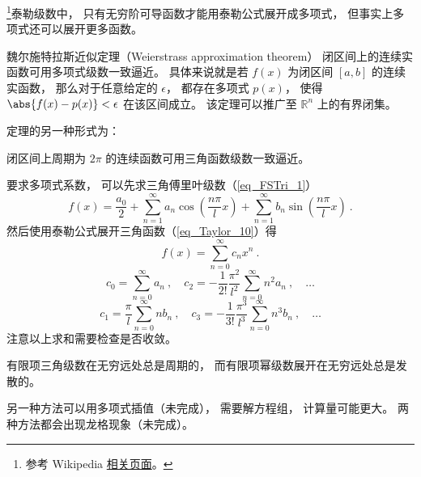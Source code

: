 \begin{issues}
\issueDraft
\end{issues}


\footnote{参考 Wikipedia \href{https://en.wikipedia.org/wiki/Stone\%E2\%80\%93Weierstrass_theorem}{相关页面}。}泰勒级数中， 只有无穷阶可导函数才能用泰勒公式展开成多项式， 但事实上多项式还可以展开更多函数。

\begin{theorem}{魏尔施特拉斯近似定理（Weierstrass approximation theorem）}
闭区间上的连续实函数可用多项式级数一致逼近。 具体来说就是若 $f(x)$ 为闭区间 $[a, b]$ 的连续实函数， 那么对于任意给定的 $\epsilon$， 都存在多项式 $p(x)$， 使得 $\abs{f(x) - p(x)} < \epsilon$ 在该区间成立。 该定理可以推广至 $\mathbb {R}^{n}$ 上的有界闭集。
\end{theorem}

定理的另一种形式为：
\begin{theorem}{}
闭区间上周期为 $2\pi$ 的连续函数可用三角函数级数一致逼近。
\end{theorem}

要求多项式系数， 可以先求三角傅里叶级数（\autoref{eq_FSTri_1}）
\begin{equation}
f(x) = \frac{a_0}{2} + \sum_{n = 1}^\infty a_n \cos (\frac{n\pi}{l}x) + \sum_{n = 1}^\infty b_n \sin (\frac{n\pi}{l}x)~.
\end{equation}
然后使用泰勒公式展开三角函数（\autoref{eq_Taylor_10}）得
\begin{equation}
f(x) = \sum_{n=0}^\infty c_n x^n~.
\end{equation}
\begin{equation}
c_0 = \sum_{n=0}^\infty a_n~,
\quad
c_2 = -\frac{1}{2!}\frac{\pi^2}{l^2} \sum_{n=0}^\infty n^2 a_n~, \quad \dots
\end{equation}
\begin{equation}
c_1 = \frac{\pi}{l} \sum_{n=0}^\infty n b_n~,
\quad
c_3 = -\frac{1}{3!}\frac{\pi^3}{l^3} \sum_{n=0}^\infty n^3 b_n~, \quad \dots
\end{equation}
注意以上求和需要检查是否收敛。

有限项三角级数在无穷远处总是周期的， 而有限项幂级数展开在无穷远处总是发散的。

另一种方法可以用多项式插值（未完成）， 需要解方程组， 计算量可能更大。 两种方法都会出现龙格现象（未完成）。
